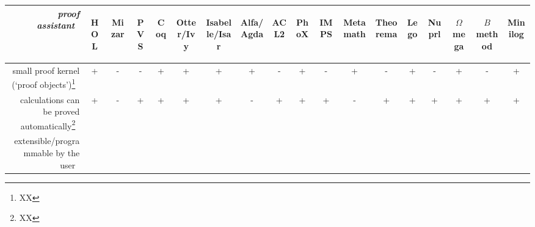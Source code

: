 \documentclass{llncs}
\begin{document}
\bigskip
\noindent
\begin{tabular}{|r|ccccc|ccccc|ccccc|cc|}\hline
~{\it proof assistant}~
&\begin{sideways}HOL\end{sideways}
&\begin{sideways}Mizar\end{sideways}
&\begin{sideways}PVS\end{sideways}
&\begin{sideways}Coq\end{sideways}
&\begin{sideways}Otter/Ivy\end{sideways}
&\begin{sideways}Isabelle/Isar\end{sideways}
&\begin{sideways}Alfa/Agda\end{sideways}
&\begin{sideways}ACL2\end{sideways}
&\begin{sideways}PhoX\end{sideways}
&\begin{sideways}IMPS\end{sideways}
&\begin{sideways}Metamath\end{sideways}
&\begin{sideways}Theorema\end{sideways}
&\begin{sideways}Lego\end{sideways}
&\begin{sideways}Nuprl\end{sideways}
&\begin{sideways}$\Omega$mega\end{sideways}
&\begin{sideways}$B$ method\end{sideways}
&\begin{sideways}Minilog\end{sideways}\\
\hline
small proof kernel (`proof objects')\footnote{XX}~
&+ &- &- &+  &+ &+ &+ &-  &+ &- &+ &-  &+ &- &+ &-  &+ 
\\
calculations can be proved automatically\footnote{XX}~
&+ &- &+ &+  &+ &+ &- &+  &+ &+ &- &+  &+ &+ &+ &+  &+ 
\\
extensible/programmable by the user~

\end{tabular}
\end{document}
